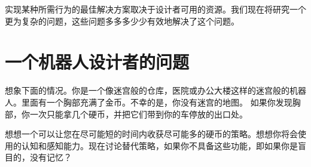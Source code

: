 
实现某种所需行为的最佳解决方案取决于设计者可用的资源。我们现在将研究一个更为复杂的问题，这些问题多多多少少有效地解决了这个问题。


\section{一个机器人设计者的问题}
想象下面的情况。你是一个像迷宫般的仓库，医院或办公大楼这样的迷宫般的机器人。里面有一个胸部充满了金币。不幸的是，你没有迷宫的地图。 如果你发现胸部，你一次只能拿几个硬币，并把它们带到你的车停放的出口处。


\begin{framed}
想想一个可以让您在尽可能短的时间内收获尽可能多的硬币的策略。想想你将会使用的认知和感知能力。现在讨论替代策略，如果你不具备这些功能，即如果你是盲目的，没有记忆？
\end{framed}



